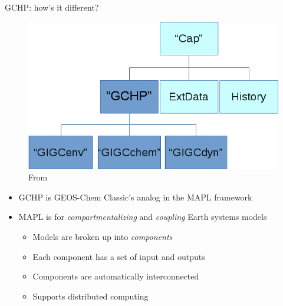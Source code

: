 \documentclass[10pt]{beamer}
\begin{document}
\begin{frame}{GCHP: how's it different?}
    \begin{minipage}[c]{0.39\textwidth}
        \begin{figure}
            \centering
            \includegraphics[width=\textwidth]{gchp_components.png}
            \captionsetup{labelformat=empty}
            \caption{From \cite{geos-chem_developers_developing_2019}}
        \end{figure}
    \end{minipage}
    \begin{minipage}[c]{0.6\textwidth}
        \begin{itemize}
            \item GCHP is GEOS-Chem Classic's analog in the MAPL framework
            \vspace{3mm}
            \item MAPL is for \textit{compartmentalizing} and \textit{coupling} Earth systems models 
            \vspace{3mm}
            \begin{itemize}
                \item Models are broken up into \textit{components}
                \vspace{3mm}
                \item Each component has a set of input and outputs
                \vspace{3mm}
                \item Components are automatically interconnected
                \vspace{3mm}
                \item Supports distributed computing
            \end{itemize}
        \end{itemize}
    \end{minipage}
\end{frame}
\end{document}
